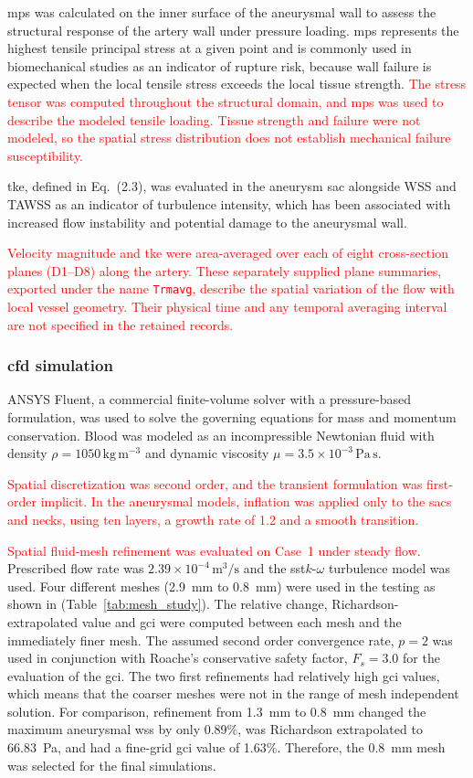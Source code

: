 \documentclass[12pt,a4paper]{article}
\newcommand{\cfdrevision}[1]{\textcolor{red}{#1}}
\newcommand{\WSS}{\ac{wss}\xspace}
\newcommand{\MPS}{\ac{mps}\xspace}
\newcommand{\TKE}{\ac{tke}\xspace}
\newcommand{\SST}{\ac{sst}\xspace}
\newcommand{\GCI}{\ac{gci}\xspace}
\newcommand{\CFDcap}{\Ac{cfd}\xspace}
\newcommand{\MPScap}{\Ac{mps}\xspace}
\newcommand{\TKEcap}{\Ac{tke}\xspace}
\theoremstyle{definition}
\numberwithin{equation}{section}
\begin{document}
\MPScap was calculated on the inner surface of the aneurysmal wall to assess the structural response of the artery wall under pressure loading. \MPS represents the highest tensile principal stress at a given point and is commonly used in biomechanical studies as an indicator of rupture risk, because wall failure is expected when the local tensile stress exceeds the local tissue strength. \cfdrevision{The stress tensor was computed throughout the structural domain, and \MPS was used to describe the modeled tensile loading. Tissue strength and failure were not modeled, so the spatial stress distribution does not establish mechanical failure susceptibility.}

\TKEcap, defined in Eq.~(2.3), was evaluated in the aneurysm sac alongside WSS and TAWSS as an indicator of turbulence intensity, which has been associated with increased flow instability and potential damage to the aneurysmal wall.

\cfdrevision{Velocity magnitude and \TKE were area-averaged over each of eight cross-section planes (D1--D8) along the artery. These separately supplied plane summaries, exported under the name \texttt{Trmavg}, describe the spatial variation of the flow with local vessel geometry. Their physical time and any temporal averaging interval are not specified in the retained records.}




\subsubsection{\label{CFD Simulation}\texorpdfstring{\CFDcap}{CFD} simulation}ANSYS Fluent, a commercial finite-volume solver with a pressure-based formulation, was used to solve the governing equations for mass and momentum conservation. Blood was modeled as an incompressible Newtonian fluid with density \(\rho = 1050\,\mathrm{kg\,m^{-3}}\) and dynamic viscosity \(\mu = 3.5 \times 10^{-3}\,\mathrm{Pa\,s}\).

\cfdrevision{Spatial discretization was second order, and the transient formulation was first-order implicit. In the aneurysmal models, inflation was applied only to the sacs and necks, using ten layers, a growth rate of 1.2 and a smooth transition.}


\cfdrevision{Spatial fluid-mesh refinement was evaluated on Case~1 under steady flow.} Prescribed flow rate was \(2.39 \times 10^{-4} \, \mathrm{m^3/s}\) and the \SST \(k\)-\(\omega\) turbulence model was used. Four different meshes (2.9~mm to 0.8~mm) were used in the testing as shown in (Table~\ref{tab:mesh_study}). The relative change, Richardson-extrapolated value and \GCI were computed between each mesh and the immediately finer mesh. The assumed second order convergence rate, $p=2$ was used in conjunction with Roache's conservative safety factor, $F_s=3.0$ for the evaluation of the \GCI. The two first refinements had relatively high \GCI values, which means that the coarser meshes were not in the range of mesh independent solution. For comparison, refinement from 1.3~mm to 0.8~mm changed the maximum aneurysmal \WSS by only 0.89\%, was Richardson extrapolated to 66.83~Pa, and had a fine-grid \GCI value of 1.63\%. Therefore, the 0.8~mm mesh was selected for the final simulations.
\end{document}
